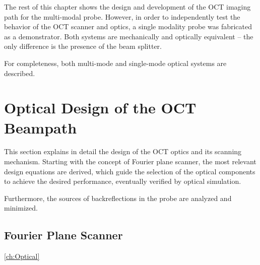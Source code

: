 The rest of this chapter shows the design and development of the OCT imaging path for the multi-modal probe. However, in order to independently test the behavior of the OCT scanner and optics, a single modality probe was fabricated as a demonstrator. Both systems are mechanically and optically equivalent -- the only difference is the presence of the beam splitter. 

For completeness, both multi-mode and single-mode optical systems are described.


\section{Optical Design of the OCT Beampath}
\label{ch:Optical}
This section explains in detail the design of the OCT optics and its scanning mechanism. Starting with the concept of Fourier plane scanner, the most relevant design equations are derived, which guide the selection of the optical components to achieve the desired performance, eventually verified by optical simulation. 

Furthermore, the sources of backreflections in the probe are analyzed and minimized.

\subsection{Fourier Plane Scanner}

\autoref{ch:Optical}



